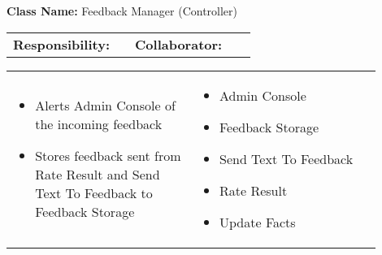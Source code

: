 \begin{red_cards}[]
    \textbf{Class Name:} Feedback Manager (Controller)
    \tcbline
    \begin{tabular}{p{0.45\linewidth} | p{0.45\linewidth}}
        \textbf{Responsibility:}& 
        \textbf{Collaborator:}\\
    \end{tabular}
    \tcbline
    \begin{tabular}{p{0.45\linewidth} | p{0.45\linewidth}}
        \begin{itemize}
            
            \item Alerts Admin Console of the incoming feedback
            \item Stores feedback sent from Rate Result and Send Text To Feedback to Feedback Storage
        \end{itemize}
        &
        \begin{itemize}
            \item Admin Console
            \item Feedback Storage
            \item Send Text To Feedback
            \item Rate Result
            \item Update Facts
        \end{itemize}
    \end{tabular}
\end{red_cards}